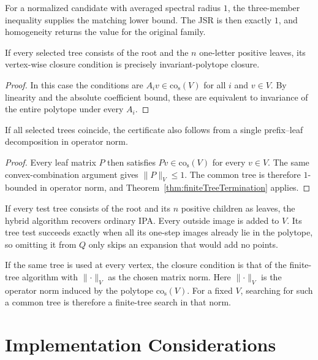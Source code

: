 For a normalized candidate with averaged spectral radius $1$, the three-member inequality supplies the matching lower bound.
The JSR is then exactly $1$, and homogeneity returns the value for the original family.

\begin{corollary}
    If every selected tree consists of the root and the $n$ one-letter positive leaves, its vertex-wise closure condition is precisely invariant-polytope closure.
\end{corollary}

\begin{proof}
    In this case the conditions are $A_iv\in\mathrm{co}_{\mathrm{s}}(V)$ for all $i$ and $v\in V$.
    By linearity and the absolute coefficient bound, these are equivalent to invariance of the entire polytope under every $A_i$.
\end{proof}

\begin{corollary}
    If all selected trees coincide, the certificate also follows from a single prefix--leaf decomposition in operator norm.
\end{corollary}

\begin{proof}
    Every leaf matrix $P$ then satisfies $Pv\in\mathrm{co}_{\mathrm{s}}(V)$ for every $v\in V$.
    The same convex-combination argument gives $\lVert P\rVert_V\leq1$.
    The common tree is therefore $1$-bounded in operator norm, and Theorem~\ref{thm:finiteTreeTermination} applies.
\end{proof}

\begin{remark}
    If every test tree consists of the root and its $n$ positive children as leaves, the hybrid algorithm recovers ordinary IPA.
    Every outside image is added to $V$.
    Its tree test succeeds exactly when all its one-step images already lie in the polytope, so omitting it from $Q$ only skips an expansion that would add no points.

    If the same tree is used at every vertex, the closure condition is that of the finite-tree algorithm with $\lVert\cdot\rVert_V$ as the chosen matrix norm.
    Here $\lVert\cdot\rVert_V$ is the operator norm induced by the polytope $\mathrm{co}_{\mathrm{s}}(V)$.
    For a fixed $V$, searching for such a common tree is therefore a finite-tree search in that norm.
\end{remark}

\section{Implementation Considerations}
\label{sec:hybridImplementation}

